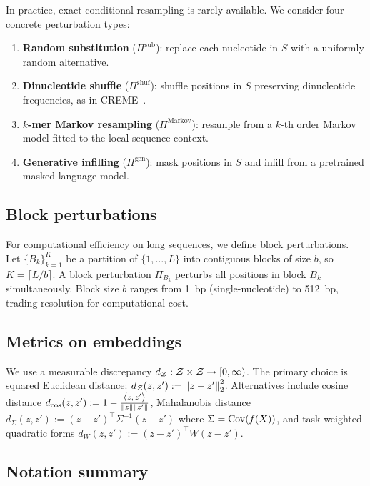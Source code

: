 In practice, exact conditional resampling is rarely available. We consider four concrete perturbation types:
\begin{enumerate}[leftmargin=2em, label=(\roman*)]
\item \textbf{Random substitution} ($\Pi^{\mathrm{sub}}$): replace each nucleotide in $S$ with a uniformly random alternative.
\item \textbf{Dinucleotide shuffle} ($\Pi^{\mathrm{shuf}}$): shuffle positions in $S$ preserving dinucleotide frequencies, as in CREME~\citep{Toneyan2024CREME}.
\item \textbf{$k$-mer Markov resampling} ($\Pi^{\mathrm{Markov}}$): resample from a $k$-th order Markov model fitted to the local sequence context.
\item \textbf{Generative infilling} ($\Pi^{\mathrm{gen}}$): mask positions in $S$ and infill from a pretrained masked language model.
\end{enumerate}

\subsection{Block perturbations}

For computational efficiency on long sequences, we define block perturbations. Let $\{B_k\}_{k=1}^K$ be a partition of $\{1,\dots,L\}$ into contiguous blocks of size $b$, so $K = \lceil L/b \rceil$. A block perturbation $\Pi_{B_k}$ perturbs all positions in block $B_k$ simultaneously. Block size $b$ ranges from 1~bp (single-nucleotide) to 512~bp, trading resolution for computational cost.

\subsection{Metrics on embeddings}

We use a measurable discrepancy $d_{\mathcal{Z}}:\mathcal{Z}\times \mathcal{Z}\to [0,\infty)$. The primary choice is squared Euclidean distance: $d_{\mathcal{Z}}(z,z') := \left\lVert z-z' \right\rVert_2^2$. Alternatives include cosine distance $d_{\cos}(z,z') := 1 - \frac{\left\langle z,\, z' \right\rangle}{\left\lVert z \right\rVert\left\lVert z' \right\rVert}$, Mahalanobis distance $d_\Sigma(z,z') := (z-z')^\top \Sigma^{-1}(z-z')$ where $\Sigma = \operatorname{Cov}(f(X))$, and task-weighted quadratic forms $d_W(z,z') := (z-z')^\top W (z-z')$.

\subsection{Notation summary}


